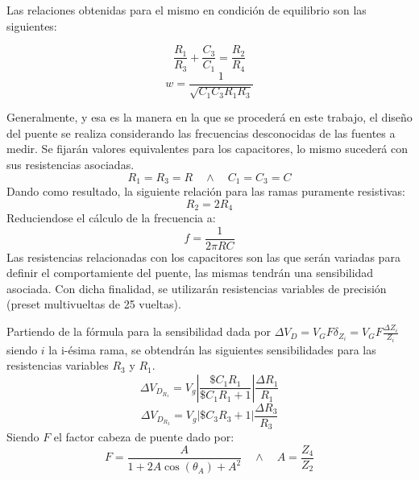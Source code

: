 Las relaciones obtenidas para el mismo en condición de equilibrio son las siguientes: \par
\begin{equation}
\frac{R_1}{R_3}+\frac{C_3}{C_1}=\frac{R_2}{R_4}
\end{equation}
\begin{equation}
w=\frac{1}{\sqrt{C_1C_3R_1R_3}}
\end{equation} \par
Generalmente, y esa es la manera en la que se procederá en este trabajo, el diseño del puente se realiza considerando las frecuencias desconocidas de las fuentes a medir. Se fijarán valores equivalentes para los capacitores, lo mismo sucederá con sus resistencias asociadas. 
\begin{equation}
R_1=R_3=R \quad	\wedge \quad C_1=C_3=C
\end{equation}
Dando como resultado, la siguiente relación para las ramas puramente resistivas:
\begin{equation}
R_2=2R_4
\end{equation}
Reduciendose el cálculo de la frecuencia a:
\begin{equation}
f=\frac{1}{2\pi RC}
\label{frec}
\end{equation}
Las resistencias relacionadas con los capacitores son las que serán variadas para definir el comportamiente del puente, las mismas tendrán una sensibilidad asociada. Con dicha finalidad, se utilizarán resistencias variables de precisión (preset multivueltas de 25 vueltas). 

Partiendo de la fórmula para la sensibilidad dada por $\Delta V_D=V_GF\delta_{Z_i}=V_GF\frac{\Delta Z_i}{Z_i}$ siendo $i$ la i-ésima rama, se obtendrán las siguientes sensibilidades para las resistencias variables $R_3$ y $R_1$.
\begin{equation}
\Delta V_{D_{R_1}}=V_g\left|\frac{\$C_1R_1}{\$C_1R_1+1}\right|\frac{\Delta R_1}{R_1}
\end{equation}
\begin{equation}
\Delta V_{D_{R_3}}=V_g\left|\$C_3R_3+1\right|\frac{\Delta R_3}{R_3}
\end{equation}
Siendo $F$ el factor cabeza de puente dado por:
\begin{equation}
F=\frac{A}{1+2A\cos(\theta_A)+A^2} \quad \wedge \quad A=\frac{Z_4}{Z_2}
\label{cabeza_de_puente}
\end{equation} 

